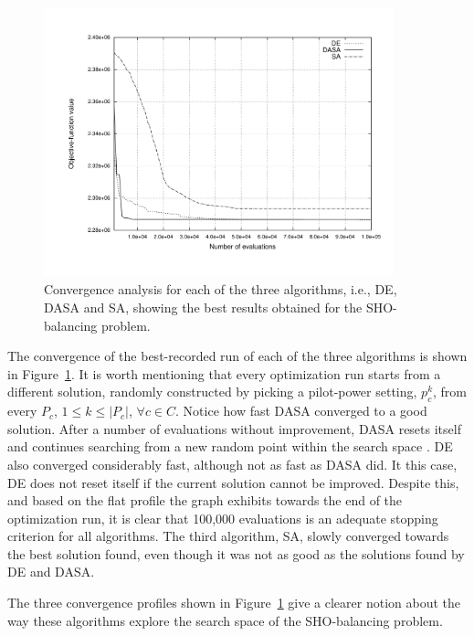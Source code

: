 \begin{figure}
\centering

\includegraphics[width=0.9\textwidth]{07-experimental_evaluation-sho_balancing/img/algorithm_convergence}

\caption{Convergence analysis for each of the three algorithms, i.e., DE, DASA
and SA, showing the best results obtained for the SHO-balancing problem.\label{fig:07-Algorithm_convergence}}
\end{figure}


The convergence of the best-recorded run of each of the three algorithms
is shown in Figure~\ref{fig:07-Algorithm_convergence}. It is worth
mentioning that every optimization run starts from a different solution,
randomly constructed by picking a pilot-power setting, $p_{c}^{k}$,
from every $P_{c}$, $1\le k\le|P_{c}|$, $\forall c\in C$. Notice
how fast DASA converged to a good solution. After a number of evaluations
without improvement, DASA resets itself and continues searching from
a new random point within the search space \cite{korosec2010_DASA}.
DE also converged considerably fast, although not as fast as DASA
did. It this case, DE does not reset itself if the current solution
cannot be improved. Despite this, and based on the flat profile the
graph exhibits towards the end of the optimization run, it is clear
that 100,000 evaluations is an adequate stopping criterion for all
algorithms. The third algorithm, SA, slowly converged towards the
best solution found, even though it was not as good as the solutions
found by DE and DASA. 

The three convergence profiles shown in Figure~\ref{fig:07-Algorithm_convergence}
give a clearer notion about the way these algorithms explore the search
space of the SHO-balancing problem.

